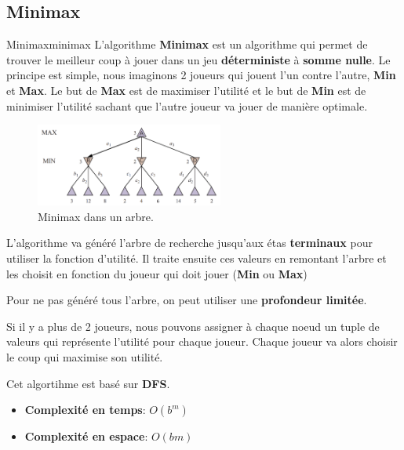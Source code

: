\subsection{Minimax} %
\label{sub:minimax}

\begin{definition}{Minimax}{minimax}
    L'algorithme \textbf{Minimax} est un algorithme qui permet de trouver le meilleur coup à jouer dans un jeu \textbf{déterministe} à \textbf{somme nulle}.
    Le principe est simple, nous imaginons 2 joueurs qui jouent l'un contre l'autre, \textbf{Min} et \textbf{Max}.
    Le but de \textbf{Max} est de maximiser l'utilité et le but de \textbf{Min} est de minimiser l'utilité sachant 
    que l'autre joueur va jouer de manière optimale.
\end{definition}

\begin{figure}[H]
    \begin{center}
        \includegraphics[width=0.55\textwidth]{./pictures/minimax.png}
    \end{center}
    \caption{Minimax dans un arbre.}\label{fig:minimaxtree}
\end{figure}


L'algorithme va généré l'arbre de recherche jusqu'aux étas \textbf{terminaux} pour utiliser la fonction d'utilité. 
Il traite ensuite ces valeurs en remontant l'arbre et les choisit en fonction du joueur qui doit jouer (\textbf{Min} ou \textbf{Max})
\begin{note}
    Pour ne pas généré tous l'arbre, on peut utiliser une \textbf{profondeur limitée}.
\end{note}

Si il y a plus de 2 joueurs, nous pouvons assigner à chaque noeud un tuple de valeurs qui représente l'utilité pour chaque joueur. 
Chaque joueur va alors choisir le coup qui maximise son utilité. 

\begin{remark}\leavevmode
    Cet algortihme est basé sur \textbf{DFS}. 
    \begin{itemize}
        \item \textbf{Complexité en temps}: $O(b^m)$
        \item \textbf{Complexité en espace}: $O(bm)$
    \end{itemize}
\end{remark}

